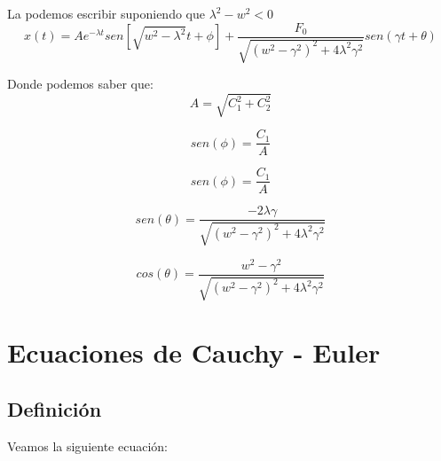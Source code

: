 \documentclass[12pt]{report}                               %
\begin{document}
        La podemos escribir suponiendo que $\lambda ^2 - w^2 < 0$
        \begin{equation*}
            x(t) = A e^{-\lambda t} sen\left[ \sqrt{w^2-\lambda^2} t + \phi \right] + \frac{F_0}{\sqrt{(w^2-\gamma^2)^2 + 4\lambda^2 \gamma^2} } sen(\gamma t + \theta)
        \end{equation*}

        Donde podemos saber que:
        \begin{equation*}
            A = \sqrt{C_1^2 + C_2^2}
        \end{equation*}

        \begin{equation*}
            sen(\phi) = \frac{C_1}{A}
        \end{equation*}

        \begin{equation*}
            sen(\phi) = \frac{C_1}{A}
        \end{equation*}

        \begin{equation*}
            sen(\theta) = \frac{-2\lambda \gamma}{\sqrt{(w^2-\gamma^2)^2 +4\lambda^2\gamma^2 }}
        \end{equation*}

        \begin{equation*}
            cos(\theta) = \frac{w^2 - \gamma^2}{\sqrt{(w^2-\gamma^2)^2 +4\lambda^2\gamma^2 }}
        \end{equation*}


\chapter{Ecuaciones de Cauchy - Euler}
    \clearpage

    \section{Definición}

        Veamos la siguiente ecuación:
\end{document}
